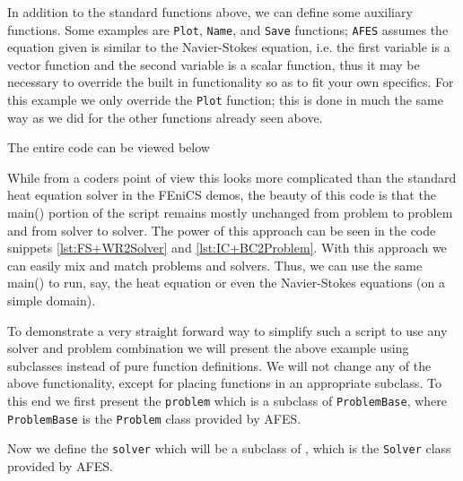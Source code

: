     In addition to the standard functions above, we can define some auxiliary
    functions. Some examples are \texttt{Plot}, \texttt{Name}, and \texttt{Save}
    functions; \texttt{AFES} assumes the equation given is similar to the Navier-Stokes
    equation, i.e. the first variable is a vector function and the second
    variable is a scalar function, thus it may be necessary to override the
    built in functionality so as to fit your own specifics. For this example we
    only override the \texttt{Plot} function; this is done in much the same way
    as we did for the other functions already seen above.
    
    

    The entire code can be viewed below
    

    While from a coders point of view this looks more complicated than the
    standard heat equation solver in the FEniCS demos, the beauty of this code
    is that the main() portion of the script remains mostly unchanged from
    problem to problem and from solver to solver. The power of this approach can
    be seen in the code snippets \autoref{lst:FS+WR2Solver} and
    \autoref{lst:IC+BC2Problem}.  With this approach we can easily mix and match
    problems and solvers. Thus, we can use the same main() to run, say, the heat
    equation or even the Navier-Stokes equations (on a simple domain).

    To demonstrate a very straight forward way to simplify such a script to use
    any solver and problem combination we will present the above example using
    subclasses instead of pure function definitions. We will not change any of
    the above functionality, except for placing functions in an appropriate
    subclass. To this end we first present the \texttt{problem} which is a
    subclass of \texttt{ProblemBase}, where \texttt{ProblemBase} is the
    \texttt{Problem} class provided by AFES.
    
    Now we define the \texttt{solver} which will be a subclass of
    , which is the \texttt{Solver} class provided by AFES.
    

